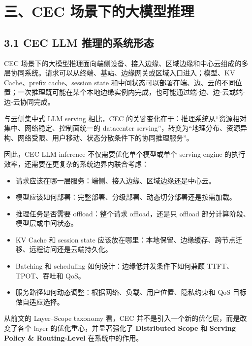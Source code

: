 \documentclass[a4paper,twocolumn,10pt]{ctexart}
\begin{document}
\section{三、CEC 场景下的大模型推理}



\subsection{3.1 CEC LLM 推理的系统形态}



CEC 场景下的大模型推理面向端侧设备、接入边缘、区域边缘和中心云组成的多层协同系统。请求可以从终端、基站、边缘网关或区域入口进入；模型、KV Cache、prefix cache、session state 和中间状态可以部署在端、边、云的不同位置；一次推理既可能在某个本地边缘实例内完成，也可能通过端-边、边-云或端-边-云协同完成。




与云侧集中式 LLM serving 相比，CEC 的关键变化在于：推理系统从“资源相对集中、网络稳定、控制面统一的 datacenter serving”，转变为“地理分布、资源异构、网络受限、用户移动、状态分散条件下的协同推理服务”。




因此，CEC LLM inference 不仅需要优化单个模型或单个 serving engine 的执行效率，还需要在更复杂的系统边界内联合考虑：




\begin{itemize}
\item 请求应该在哪一层服务：端侧、接入边缘、区域边缘还是中心云。

\item 模型应该如何部署：完整部署、分级部署、动态切分部署还是按需加载。

\item 推理任务是否需要 offload：整个请求 offload，还是只 offload 部分计算阶段、模型层或中间状态。

\item KV Cache 和 session state 应该放在哪里：本地保留、边缘缓存、跨节点迁移、远程访问还是云端持久化。

\item Batching 和 scheduling 如何设计：边缘低并发条件下如何兼顾 TTFT、TPOT、吞吐和 QoS。

\item 服务路径如何动态调整：根据网络、负载、用户位置、隐私约束和 QoS 目标做自适应选择。



\end{itemize}
从前文的 Layer–Scope taxonomy 看，CEC 并不是引入一个新的优化层，而是改变了各个 layer 的优化重心，并显著强化了 \textbf{Distributed Scope} 和 \textbf{Serving Policy \& Routing-Level} 在系统中的作用。
\end{document}

